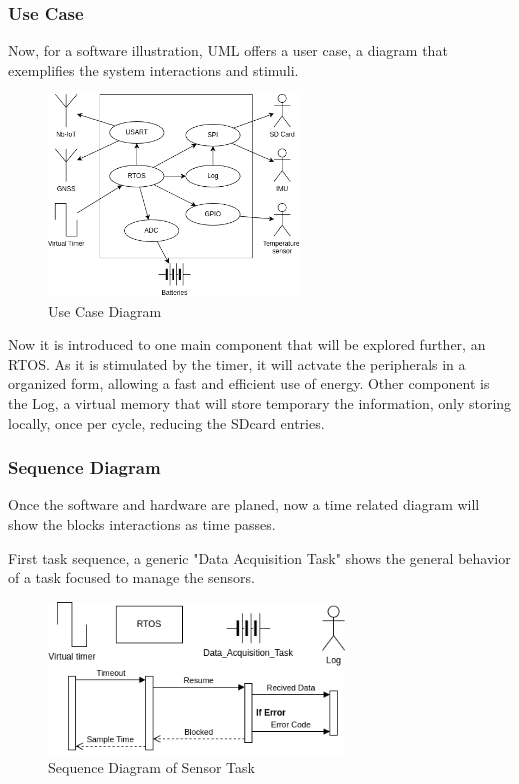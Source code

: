 \subsubsection{Use Case}

Now, for a software illustration, UML offers a user case, a diagram that exemplifies the system interactions and stimuli.

\begin{figure}[H]
    \centering
    \includegraphics[width=0.6\textwidth]{images/diagrams/use_case/Use Case.drawio.png}  %
    \caption{Use Case Diagram}
    \label{fig:Use Case Diagram}        
\end{figure}

Now it is introduced to one main component that will be explored further, an RTOS. As it is stimulated by the timer, it will actvate the 
peripherals in a organized form, allowing a fast and efficient use of energy. Other component is the Log, a virtual memory that will store
temporary the information, only storing locally, once per cycle, reducing the SDcard entries.

\subsubsection{Sequence Diagram}

Once the software and hardware are planed, now a time related diagram will show the blocks interactions
as time passes.

First task sequence, a generic "Data Acquisition Task" shows the general behavior of a task focused to manage the sensors.

\begin{figure}[H]
    \centering
    \includegraphics[width=0.7\textwidth]{images/diagrams/sequence_diagram/sequence_diagram_1/Sequence Diagram.drawio.png}  %
    \caption{Sequence Diagram of Sensor Task}
    \label{fig:Sequence Diagram of Sensor Task}
\end{figure}


